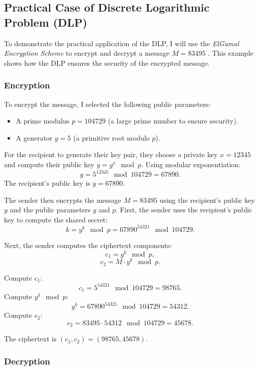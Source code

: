 \documentclass[12pt]{article}
\begin{document}
\subsection*{Practical Case of Discrete Logarithmic Problem (DLP)}

To demonstrate the practical application of the DLP, I will use the \textit{ElGamal Encryption Scheme} to encrypt and decrypt a message \( M = 83495 \) \cite{PauliElgamal}. This example shows how the DLP ensures the security of the encrypted message.

\subsubsection*{Encryption}

To encrypt the message, I selected the following public parameters:
\begin{itemize}
    \item A prime modulus \( p = 104729 \) (a large prime number to ensure security).
    \item A generator \( g = 5 \) (a primitive root modulo \( p \)).
\end{itemize}

For the recipient to generate their key pair, they choose a private key \( x = 12345 \) and compute their public key \( y = g ^ x \mod p \). Using modular exponentiation:
\[
y = 5^{12345} \mod 104729 = 67890.
\]
\centering The recipient’s public key is \( y = 67890 \).\raggedright \setlength{\parindent}{0.5in}

The sender then encrypts the message \( M = 83495 \) using the recipient’s public key \( y \) and the public parameters \( g \) and \( p \). First, the sender uses the recipient’s public key to compute the shared secret:
\[
k = y^k \mod p = 67890^{54321} \mod 104729.
\]

\centering Next, the sender computes the ciphertext components:
\[
c_1 = g^k \mod p,
\]
\[
c_2 = M \cdot y^k \mod p.
\]

Compute \( c_1 \):
\[
c_1 = 5^{54321} \mod 104729 = 98765.
\]
Compute \( y^k \mod p \):
\[
y^k = 67890^{54321} \mod 104729 = 54312.
\]
Compute \( c_2 \):
\[
c_2 = 83495 \cdot 54312 \mod 104729 = 45678.
\]

The ciphertext is \( (c_1, c_2) = (98765, 45678) \).

\raggedright
\setlength{\parindent}{0.5in} %

\subsubsection*{Decryption}
\end{document}
